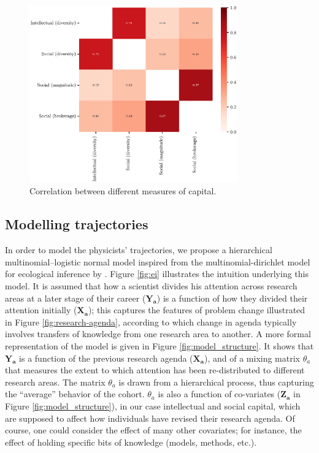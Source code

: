 \documentclass{article}
\begin{document}
\begin{figure}
    \centering
    \includegraphics[width=0.8\textwidth]{plots/capital_measures.eps}
    \caption{Correlation between different measures of capital.}
    \label{fig:capital_measures}
\end{figure}

\subsection{\label{sec:model}Modelling trajectories}

In order to model the physicists' trajectories, we propose a hierarchical multinomial--logistic normal model inspired from the multinomial-dirichlet model for ecological inference by \citet{RosJiaKin01}. Figure \ref{fig:ei} illustrates the intuition underlying this model. It is assumed that how a scientist divides his attention across research areas at a later stage of their career ($\bm{Y_{a}}$) is a function of how they divided their attention initially ($\bm{X_{a}}$); this captures the features of problem change illustrated in Figure \ref{fig:research-agenda}, according to which change in agenda typically involves transfers of knowledge from one research area to another. A more formal representation of the model is given in Figure \ref{fig:model_structure}. It shows that $\bm{Y_{a}}$ is a function of the previous research agenda ($\bm{X_{a}}$), and of a mixing matrix $\theta_a$ that measures the extent to which attention has been re-distributed to different research areas. The matrix $\theta_a$ is drawn from a hierarchical process, thus capturing the ``average'' behavior of the cohort. $\theta_a$ is also a function of co-variates ($\bm{Z_a}$ in Figure \ref{fig:model_structure}), in our case intellectual and social capital, which are supposed to affect how individuals have revised their research agenda. Of course, one could consider the effect of many other covariates; for instance, the effect of holding specific bits of knowledge (models, methods, etc.).
\end{document}
